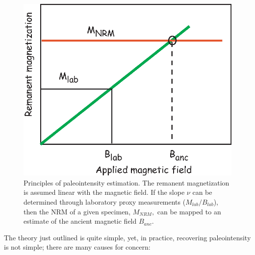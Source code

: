  \begin{figure}[htb]
\centering  \includegraphics[width= 8 cm]{EPSfiles/pintprinc.eps}
\caption{Principles of  paleointensity estimation.  The remanent magnetization is assumed linear with the magnetic field. If the slope $\nu$ can be determined through laboratory proxy measurements ($M_{lab}/B_{lab}$), then the  NRM of a given specimen, $M_{NRM},$ can be mapped to an estimate of the ancient magnetic field $B_{anc}$.}
\label{fig:pintprinc}
\end{figure}


The theory just outlined is quite simple, yet, in practice, recovering paleointensity is not simple; there are many causes for concern:

